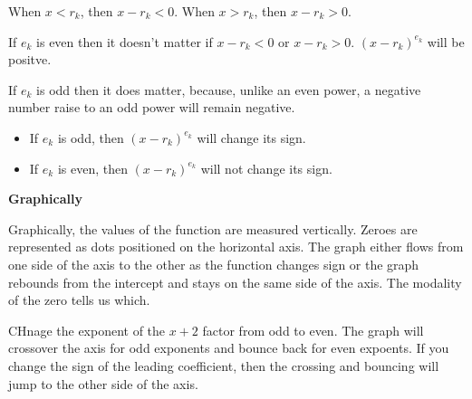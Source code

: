 \documentclass{ximera}
\begin{document}
When $x<r_k$, then $x-r_k <0$.  When $x>r_k$, then $x-r_k >0$.

If $e_k$ is even then it doesn't matter if $x-r_k <0$ or $x-r_k >0$. $(x-r_k)^{e_k}$ will be positve. 

If $e_k$ is odd then it does matter, because, unlike an even power, a negative number raise to an odd power will remain negative.





\begin{itemize}
\item If $e_k$ is odd, then $(x-r_k)^{e_k}$ will change its sign.
\item If $e_k$ is even, then $(x-r_k)^{e_k}$ will not change its sign.
\end{itemize}









\textbf{\large Graphically}


Graphically, the values of the function are measured vertically. Zeroes are represented as dots positioned on the horizontal axis.  The graph either flows from one side of the axis to the other as the function changes sign or the graph rebounds from the intercept and stays on the same side of the axis.  The modality of the zero tells us which.






\begin{example}

CHnage the exponent of the $x+2$ factor from odd to even.  The graph will crossover the axis for odd exponents and bounce back for even expoents.  If you change the sign of the leading coefficient, then the crossing and bouncing will jump to the other side of the axis.



\begin{center}
\end{center}

\end{example}
\end{document}
